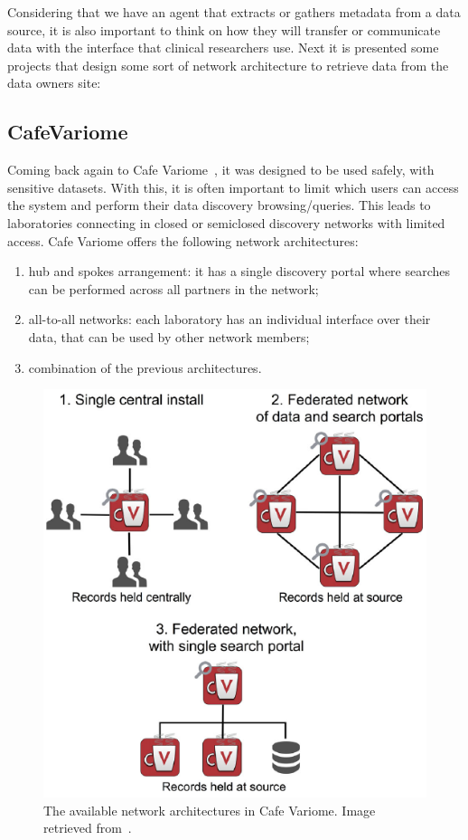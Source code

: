 Considering that we have an agent that extracts or gathers metadata from a data source,
it is also important to think on how they will transfer or communicate data with the
interface that clinical researchers use.
Next it is presented some projects that design some sort of network architecture to
retrieve data from the data owners site:


\subsection*{CafeVariome}
Coming back again to Cafe Variome~\cite{cafevariome}, it was designed to be used safely, with sensitive datasets.
With this, it is often important to limit which users can access the system and perform their data discovery browsing/queries.
This leads to laboratories connecting in closed or semiclosed discovery networks with limited access.
Cafe Variome offers the following network architectures:
\begin{enumerate}
    \item hub and spokes arrangement: it has a single discovery portal where searches can be performed across all partners in the network;
    \item all-to-all networks: each laboratory has an individual interface over their data, that can be used by other network members;
    \item combination of the previous architectures.
\end{enumerate}

\begin{figure}[H]
    \centering
    \includegraphics[width=.5\linewidth]{cafevariome-network.png}
    \caption{The available network architectures in Cafe Variome. Image retrieved from~\cite{cafevariome}.}
\end{figure}

